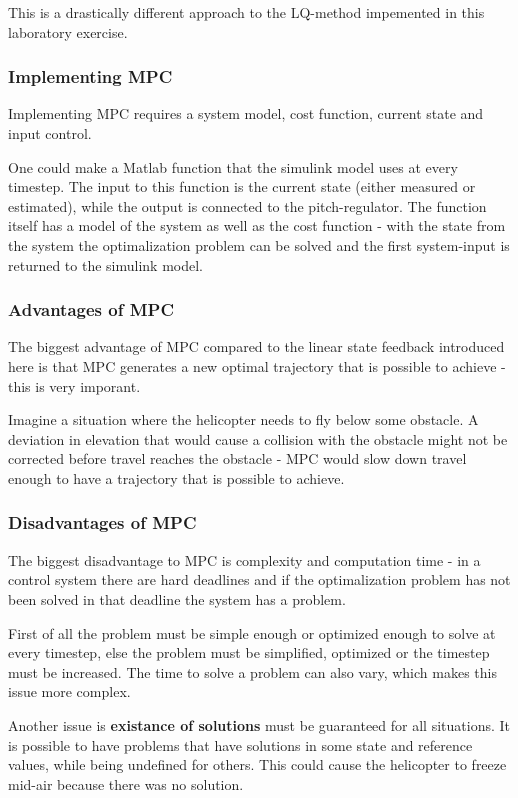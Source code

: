 \documentclass[../main.tex]{subfiles}
\begin{document}
This is a drastically different approach to the LQ-method impemented in this laboratory exercise.

\subsubsection{Implementing MPC}
Implementing MPC requires a system model, cost function, current state and input control.

One could make a Matlab function that the simulink model uses at every timestep. The input to this function is the current state (either measured or estimated), while the output is connected to the pitch-regulator. The function itself has a model of the system as well as the cost function - with the state from the system the optimalization problem can be solved and the first system-input is returned to the simulink model. 

\subsubsection{Advantages of MPC}
The biggest advantage of MPC compared to the linear state feedback introduced here is that MPC generates a new optimal trajectory that is possible to achieve - this is very imporant.

Imagine a situation where the helicopter needs to fly below some obstacle. A deviation in elevation that would cause a collision with the obstacle might not be corrected before travel reaches the obstacle - MPC would slow down travel enough to have a trajectory that is possible to achieve.

\subsubsection{Disadvantages of MPC}
The biggest disadvantage to MPC is complexity and computation time - in a control system there are hard deadlines and if the optimalization problem has not been solved in that deadline the system has a problem.

First of all the problem must be simple enough or optimized enough to solve at every timestep, else the problem must be simplified, optimized or the timestep must be increased. The time to solve a problem can also vary, which makes this issue more complex.

Another issue is \textbf{existance of solutions} must be guaranteed for all situations. It is possible to have problems that have solutions in some state and reference values, while being undefined for others. This could cause the helicopter to freeze mid-air because there was no solution.
\end{document}
